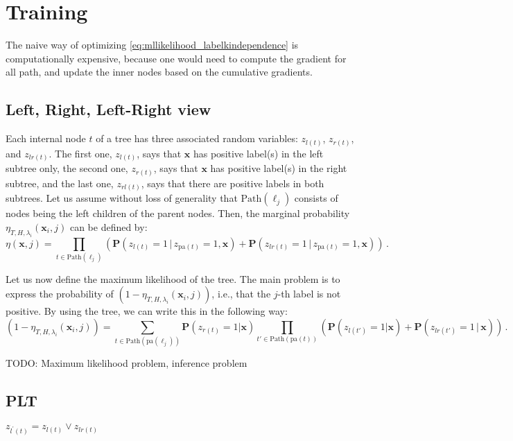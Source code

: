 \documentclass{article}
\newcommand{\Path}[1]{\mathrm{Path}(#1)}
\newcommand{\pa}[1]{\mathrm{pa}(#1)}
\newcommand{\bx}{\mathbf{x}}
\newcommand{\prob}{\mathbf{P}}
\newcommand{\given}{\, | \,}
\newcommand{\Algo}[1]{\textsc{#1}}
\begin{document}
\section{Training}

The naive way of optimizing \ref{eq:mllikelihood_labelkindependence} is computationally expensive, because one would need to compute the gradient for all path, and update the inner nodes based on the cumulative gradients. 




\subsection{Left, Right, Left-Right view}

Each internal node $t$ of a tree has three associated random variables: $z_{l(t)}$, $z_{r(t)}$, and $z_{lr(t)}$. The first one, $z_{l(t)}$, says that $\bx$ has positive label(s) in the left subtree only, the second one, $z_{r(t)}$, says that $\bx$ has positive label(s) in the right subtree, and the last one, $z_{rl(t)}$, says that there are positive labels in both subtrees. Let us assume without loss of generality that $\Path{\ell_j}$ consists of nodes being the left children of the parent nodes. Then, the marginal probability $\eta_{T,H,\lambda_i} ( \bx_i , j )$ can be defined by:
\begin{equation}
\eta(\bx, j) = \prod_{t \in \Path{\ell_j}}  \left ( \prob(z_{l(t)} = 1 \given z_{\pa{t}} =1, \bx) + \prob(z_{lr(t)} = 1 \given z_{\pa{t}} =1, \bx) \right ) \,.
\label{eqn:probabilistic_tree}
\end{equation}

Let us now define the maximum likelihood of the tree. The main problem is to express the probability of  $(1-\eta_{T,H,\lambda_i} ( \bx_i , j ))$, i.e., that the $j$-th label is not positive. By using the tree, we can write this in the following way:
\[
(1-\eta_{T,H,\lambda_i} ( \bx_i , j )) = \sum_{t \in \Path{\pa{\ell_j}}}   \prob(z_{r(t)} = 1 | \bx)  \prod_{t' \in \Path{\pa{t}}} \left ( \prob(z_{l(t')} = 1 | \bx) + \prob(z_{lr(t')} = 1 \given \bx) \right )  \,.
\]

TODO: Maximum likelihood problem, inference problem


\subsection{\Algo{PLT}}

$z_{l^{\prime}(t)} = z_{l(t)} \vee z_{lr(t)}$ 
\end{document}
